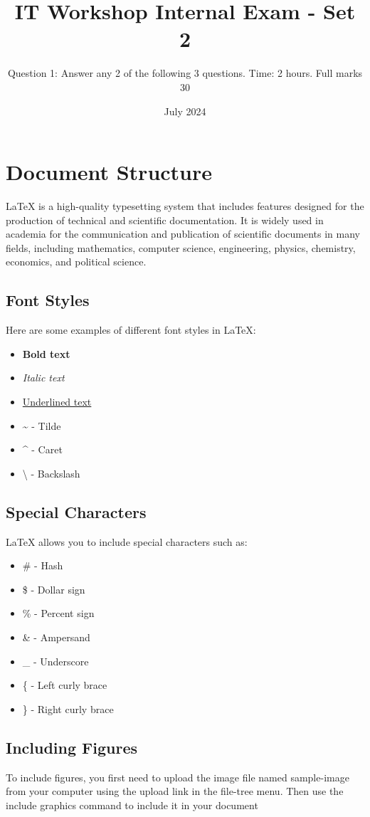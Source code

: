 \documentclass{article}
\title{IT Workshop Internal Exam - Set 2}
\author{Question 1: Answer any 2 of the following 3 questions. Time: 2 hours. Full marks 30}
\date{July 2024}
\begin{document}
	\maketitle
	
	\section{Document Structure}
	LaTeX is a high-quality typesetting system that includes features designed for the production of technical and scientific documentation. It is widely used in academia for the communication and publication of scientific documents in many fields, including mathematics, computer science, engineering, physics, chemistry, economics, and political science.
	
	\subsection{Font Styles}
	Here are some examples of different font styles in \LaTeX:
	\begin{itemize}
		\item \textbf{Bold text}
		\item \textit{Italic text}
		\item \underline{Underlined text}
		\item \~{} - Tilde
		\item \^{} - Caret
		\item \textbackslash{} - Backslash
	\end{itemize}
	
	\subsection{Special Characters}
	LaTeX allows you to include special characters such as:
	\begin{itemize}
		\item \# - Hash
		\item \$ - Dollar sign
		\item \% - Percent sign
		\item \& - Ampersand
		\item \_ - Underscore
		\item \{ - Left curly brace
		\item \} - Right curly brace
	\end{itemize}
	\subsection{Including Figures}
	To include figures, you first need to upload the image file named sample-image from your computer using the upload link in the file-tree menu. Then use the include graphics command to include
	it in your document	
	
\end{document}
